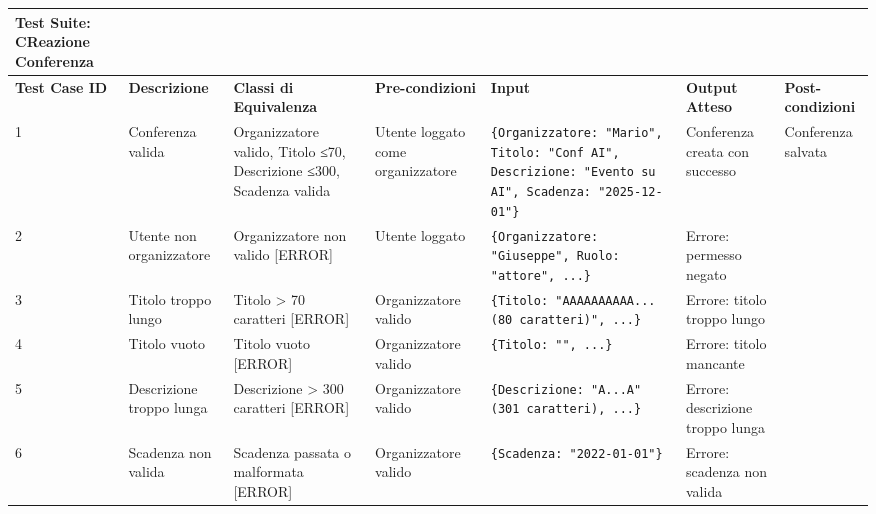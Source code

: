 \begin{sidewaystable}
\begin{tabular}{|p{2cm}|p{2cm}|p{2cm}|p{2cm}|p{5cm}|p{2cm}|p{2cm}|}
\hline
\rowcolor{SkyBlue}
\textbf{Test Suite: CReazione Conferenza} & & & & & &\\
\hline
\rowcolor{Red}
\textbf{Test Case ID} & \textbf{Descrizione} & \textbf{Classi di Equivalenza} & \textbf{Pre-condizioni} & \textbf{Input} & \textbf{Output Atteso} & \textbf{Post-condizioni} \\
\hline
1 & Conferenza valida & Organizzatore valido, Titolo ≤70, Descrizione ≤300, Scadenza valida & Utente loggato come organizzatore & \texttt{\{Organizzatore: "Mario", Titolo: "Conf AI", Descrizione: "Evento su AI", Scadenza: "2025-12-01"\}} & Conferenza creata con successo & Conferenza salvata \\
\hline
2 & Utente non organizzatore & Organizzatore non valido [ERROR] & Utente loggato & \texttt{\{Organizzatore: "Giuseppe", Ruolo: "attore", ...\}} & Errore: permesso negato & \\
\hline
3 & Titolo troppo lungo & Titolo > 70 caratteri [ERROR] & Organizzatore valido & \texttt{\{Titolo: "AAAAAAAAAA... (80 caratteri)", ...\}} & Errore: titolo troppo lungo & \\
\hline
4 & Titolo vuoto & Titolo vuoto [ERROR] & Organizzatore valido & \texttt{\{Titolo: "", ...\}} & Errore: titolo mancante & \\
\hline
5 & Descrizione troppo lunga & Descrizione > 300 caratteri [ERROR] & Organizzatore valido & \texttt{\{Descrizione: "A...A" (301 caratteri), ...\}} & Errore: descrizione troppo lunga & \\
\hline
6 & Scadenza non valida & Scadenza passata o malformata [ERROR] & Organizzatore valido & \texttt{\{Scadenza: "2022-01-01"\}} & Errore: scadenza non valida & \\
\hline
\end{tabular}
\end{sidewaystable}

